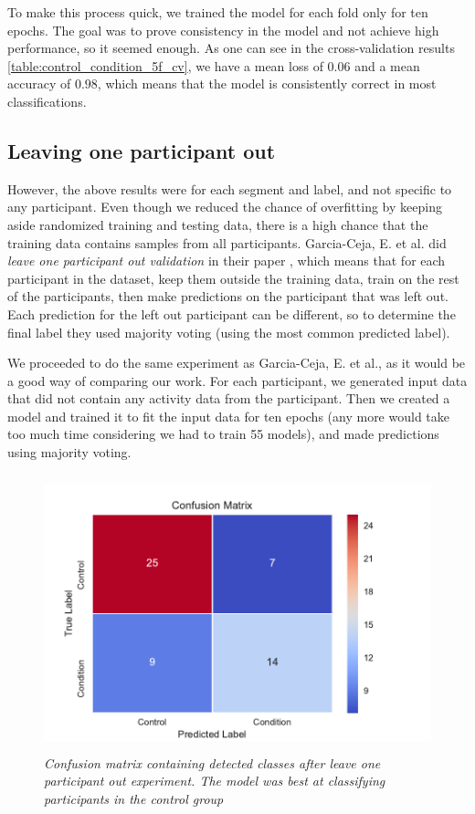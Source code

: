 To make this process quick, we trained the model for each fold only for ten epochs. The goal was to prove consistency in the model and not achieve high performance, so it seemed enough. As one can see in the cross-validation results \ref{table:control_condition_5f_cv}, we have a mean loss of $0.06$ and a mean accuracy of $0.98$, which means that the model is consistently correct in most classifications.

\subsection{Leaving one participant out}

However, the above results were for each segment and label, and not specific to any participant. Even though we reduced the chance of overfitting by keeping aside randomized training and testing data, there is a high chance that the training data contains samples from all participants. Garcia-Ceja, E. et al. did \textit{leave one participant out validation} in their paper \cite{GarciaCeja2018_classification_bipolar}, which means that for each participant in the dataset, keep them outside the training data, train on the rest of the participants, then make predictions on the participant that was left out. Each prediction for the left out participant can be different, so to determine the final label they used majority voting (using the most common predicted label). 

We proceeded to do the same experiment as Garcia-Ceja, E. et al., as it would be a good way of comparing our work. For each participant, we generated input data that did not contain any activity data from the participant. Then we created a model and trained it to fit the input data for ten epochs (any more would take too much time considering we had to train 55 models), and made predictions using majority voting. 

\begin{figure}[h]
\begin{center}
      \includegraphics[height=8cm]{img/control_condition/leave_one_out.pdf}
      \caption{\textit{Confusion matrix containing detected classes after leave one participant out experiment. The model was best at classifying participants in the control group }}
      \label{figure:control_condition_conf_loo}
\end{center}
\end{figure}


